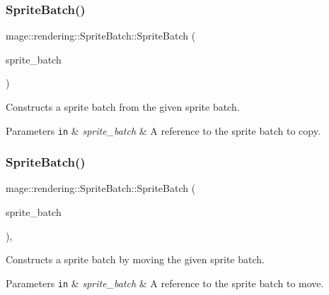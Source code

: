 \subsubsection{\texorpdfstring{Sprite\+Batch()}{SpriteBatch()}\hspace{0.1cm}{\footnotesize\ttfamily [2/3]}}
{\footnotesize\ttfamily mage\+::rendering\+::\+Sprite\+Batch\+::\+Sprite\+Batch (\begin{DoxyParamCaption}\item[{const \hyperlink{classmage_1_1rendering_1_1_sprite_batch}{Sprite\+Batch} \&}]{sprite\+\_\+batch }\end{DoxyParamCaption})\hspace{0.3cm}{\ttfamily [delete]}}

Constructs a sprite batch from the given sprite batch.


\begin{DoxyParams}[1]{Parameters}
\mbox{\tt in}  & {\em sprite\+\_\+batch} & A reference to the sprite batch to copy. \\
\hline
\end{DoxyParams}
\hypertarget{classmage_1_1rendering_1_1_sprite_batch_a91644c1c0c3e53a87f470116ec9746dc}{}\label{classmage_1_1rendering_1_1_sprite_batch_a91644c1c0c3e53a87f470116ec9746dc} 
\subsubsection{\texorpdfstring{Sprite\+Batch()}{SpriteBatch()}\hspace{0.1cm}{\footnotesize\ttfamily [3/3]}}
{\footnotesize\ttfamily mage\+::rendering\+::\+Sprite\+Batch\+::\+Sprite\+Batch (\begin{DoxyParamCaption}\item[{\hyperlink{classmage_1_1rendering_1_1_sprite_batch}{Sprite\+Batch} \&\&}]{sprite\+\_\+batch }\end{DoxyParamCaption})\hspace{0.3cm}{\ttfamily [default]}, {\ttfamily [noexcept]}}

Constructs a sprite batch by moving the given sprite batch.


\begin{DoxyParams}[1]{Parameters}
\mbox{\tt in}  & {\em sprite\+\_\+batch} & A reference to the sprite batch to move. \\
\hline
\end{DoxyParams}
\hypertarget{classmage_1_1rendering_1_1_sprite_batch_aedb2831f0054cedb1ede8be8f27e0432}{}\label{classmage_1_1rendering_1_1_sprite_batch_aedb2831f0054cedb1ede8be8f27e0432} 
